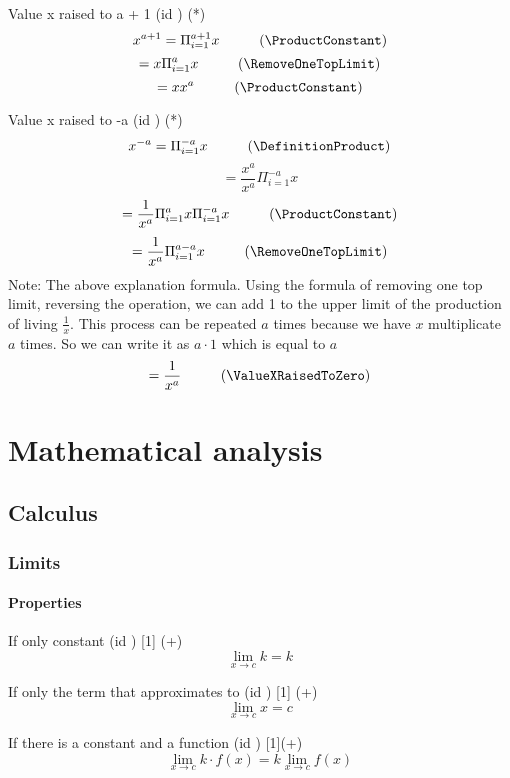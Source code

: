 \documentclass{book}
\begin{document}
                Value x raised to a + 1 (id \ValueXRaisedPlus) (*)
                \[x^{a + 1} = \Pi^{a + 1}_{i=1} x \hspace{1cm} (\ProductConstant)\]
                \[= x\Pi^{a}_{i=1}x \hspace{1cm} (\RemoveOneTopLimit)\]
                \[= x x^a \hspace{1cm} (\ProductConstant)\]

                Value x raised to -a (id \ValueRaisedNegative) (*)
                \[x^{-a} = \Pi^{-a}_{i=1}x \hspace{1cm} (\DefinitionProduct)\]
                \[= \frac{x^a}{x^a} \Pi^{-a}_{i=1} x\]
                \[= \frac{1}{x^a} \Pi^a_{i=1} x \Pi^{-a}_{i=1} x \hspace{1cm} (\ProductConstant)\]
                \[= \frac{1}{x^a} \Pi^{a-a}_{i=1} x \hspace{1cm} (\RemoveOneTopLimit)\]
                Note: The above explanation formula. Using the formula of removing one top limit, reversing the operation, we can add 1 to the upper limit of the production of living $\frac{1}{x}$. This process can be repeated $a$ times because we have $x$ multiplicate $a$ times. So we can write it as $a \cdot 1$ which is equal to $a$
                \[= \frac{1}{x^a} \hspace{1cm} (\ValueXRaisedToZero)\]
            
    \chapter{Mathematical analysis}                    
        \section{Calculus}
            \subsection{Limits}
                \subsubsection{Properties}
                    If only constant (id \LimitConstant) [1] (+)
                    \[\lim_{x \rightarrow c} k = k\]
    
                    If only the term that approximates to (id \LimitToHim) [1] (+)
                    \[\lim_{x \rightarrow c} x = c\]
    
                    If there is a constant and a function (id \LimitConstantFuntion) [1](+)
                    \[\lim_{x \rightarrow c} k \cdot f(x) = k \lim_{x \rightarrow c} f(x)\]
    
\end{document}
